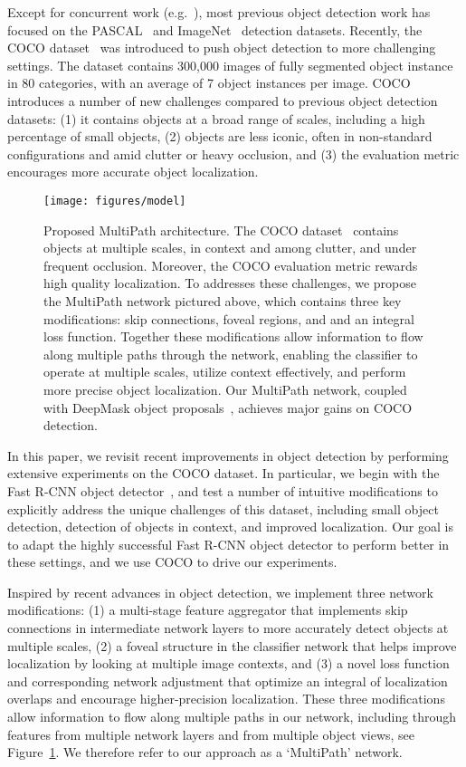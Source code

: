 \documentclass{bmvc2k}
\newcommand{\Caption}[1]{\caption{\small#1}}
\newcommand{\fig}[1]{Figure~\ref{fig:#1}}
\begin{document}
Except for concurrent work (e.g.~\cite{bell15ion, he2015deep, he2015segmentation}), most previous object detection work has focused on the PASCAL~\cite{Everingham10} and ImageNet~\cite{imagenet_cvpr09} detection datasets. Recently, the COCO dataset~\cite{mscoco2015} was introduced to push object detection to more challenging settings. The dataset contains 300,000 images of fully segmented object instance in 80 categories, with an average of 7 object instances per image. COCO introduces a number of new challenges compared to previous object detection datasets: (1) it contains objects at a broad range of scales, including a high percentage of small objects, (2) objects are less iconic, often in non-standard configurations and amid clutter or heavy occlusion, and (3) the evaluation metric encourages more accurate object localization.

\begin{figure}[t]
 \texttt{[image: figures/model]}
\Caption{Proposed MultiPath architecture. The COCO dataset~\cite{mscoco2015} contains objects at multiple scales, in context and among clutter, and under frequent occlusion. Moreover, the COCO evaluation metric rewards high quality localization. To addresses these challenges, we propose the MultiPath network pictured above, which contains three key modifications: skip connections, foveal regions, and and an integral loss function. Together these modifications allow information to flow along multiple paths through the network, enabling the classifier to operate at multiple scales, utilize context effectively, and perform more precise object localization. Our MultiPath network, coupled with DeepMask object proposals~\cite{pinheiro2015learning, pinheiro2016refining}, achieves major gains on COCO detection.}
\label{fig:model}
\end{figure}


In this paper, we revisit recent improvements in object detection by performing extensive experiments on the COCO dataset. In particular, we begin with the Fast R-CNN object detector~\cite{girshick15fastrcnn}, and test a number of intuitive modifications to explicitly address the unique challenges of this dataset, including small object detection, detection of objects in context, and improved localization. Our goal is to adapt the highly successful Fast R-CNN object detector to perform better in these settings, and we use COCO to drive our experiments.

Inspired by recent advances in object detection, we implement three network modifications: (1) a multi-stage feature aggregator that implements skip connections in intermediate network layers to more accurately detect objects at multiple scales, (2) a foveal structure in the classifier network that helps improve localization by looking at multiple image contexts, and (3) a novel loss function and corresponding network adjustment that optimize an integral of localization overlaps and encourage higher-precision localization. These three modifications allow information to flow along multiple paths in our network, including through features from multiple network layers and from multiple object views, see \fig{model}. We therefore refer to our approach as a `MultiPath' network.
\end{document}
